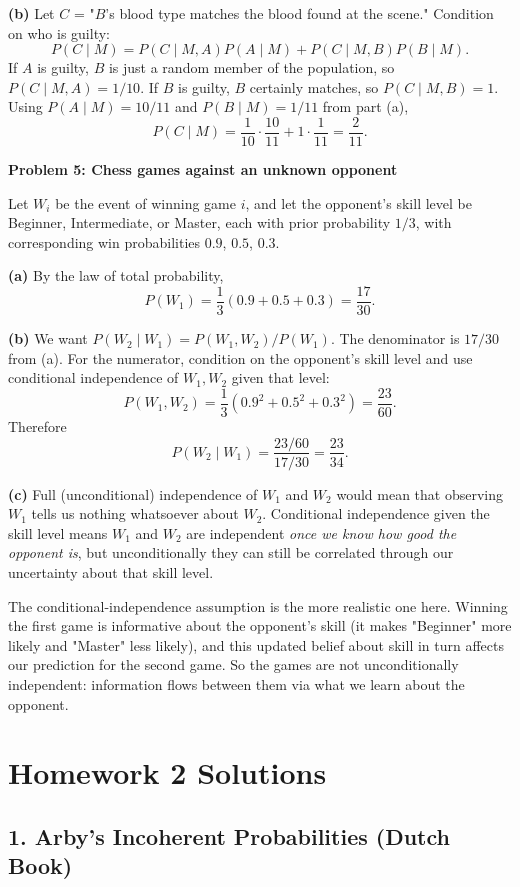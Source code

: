\documentclass{article}
\begin{document}
\medskip
\textbf{(b)} Let $C$ = "$B$'s blood type matches the blood found at the scene." Condition on who is guilty:
$$
P(C\mid M) = P(C\mid M,A)P(A\mid M) + P(C\mid M,B)P(B\mid M).
$$
If $A$ is guilty, $B$ is just a random member of the population, so $P(C\mid M,A) = 1/10$. If $B$ is guilty, $B$ certainly matches, so $P(C\mid M,B)=1$. Using $P(A\mid M)=10/11$ and $P(B\mid M)=1/11$ from part (a),
$$
P(C\mid M) = \frac{1}{10}\cdot\frac{10}{11} + 1\cdot\frac{1}{11} = \frac{2}{11}.
$$

\bigskip
\textbf{Problem 5: Chess games against an unknown opponent}

Let $W_i$ be the event of winning game $i$, and let the opponent's skill level be Beginner, Intermediate, or Master, each with prior probability $1/3$, with corresponding win probabilities $0.9$, $0.5$, $0.3$.

\textbf{(a)} By the law of total probability,
$$P(W_1) = \frac{1}{3}(0.9+0.5+0.3) = \frac{17}{30}.$$

\medskip
\textbf{(b)} We want $P(W_2\mid W_1) = P(W_1,W_2)/P(W_1)$. The denominator is $17/30$ from (a). For the numerator, condition on the opponent's skill level and use conditional independence of $W_1,W_2$ given that level:
$$
P(W_1,W_2) = \frac{1}{3}\left(0.9^2 + 0.5^2 + 0.3^2\right) = \frac{23}{60}.
$$
Therefore
$$P(W_2\mid W_1) = \frac{23/60}{17/30} = \frac{23}{34}.$$

\medskip
\textbf{(c)} Full (unconditional) independence of $W_1$ and $W_2$ would mean that observing $W_1$ tells us nothing whatsoever about $W_2$. Conditional independence given the skill level means $W_1$ and $W_2$ are independent \emph{once we know how good the opponent is}, but unconditionally they can still be correlated through our uncertainty about that skill level.

The conditional-independence assumption is the more realistic one here. Winning the first game is informative about the opponent's skill (it makes "Beginner" more likely and "Master" less likely), and this updated belief about skill in turn affects our prediction for the second game. So the games are not unconditionally independent: information flows between them via what we learn about the opponent.

\bigskip
\section*{Homework 2 Solutions}

\subsection*{1. Arby's Incoherent Probabilities (Dutch Book)}
\end{document}
